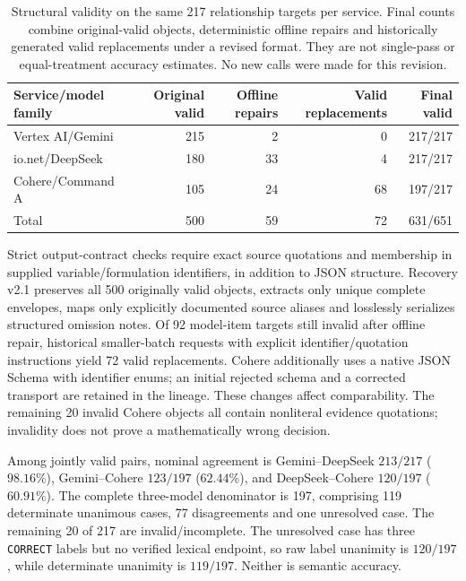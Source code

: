 \begin{table}[htbp]\centering\small
\caption{Structural validity on the same 217 relationship targets per service. Final counts combine original-valid objects, deterministic offline repairs and historically generated valid replacements under a revised format. They are not single-pass or equal-treatment accuracy estimates. No new calls were made for this revision.}\label{tab:relationship-validity}
\setlength{\tabcolsep}{3.5pt}
\begin{tabular}{@{}lrrrr@{}}\toprule
Service/model family & Original valid & Offline repairs & Valid replacements & Final valid\\\midrule
Vertex AI/Gemini & 215 & 2 & 0 & 217/217\\
io.net/DeepSeek & 180 & 33 & 4 & 217/217\\
Cohere/Command A & 105 & 24 & 68 & 197/217\\\midrule
Total & 500 & 59 & 72 & 631/651\\\bottomrule
\end{tabular}\end{table}

Strict output-contract checks require exact source quotations and membership in supplied variable/formulation identifiers, in addition to JSON structure. Recovery v2.1 preserves all 500 originally valid objects, extracts only unique complete envelopes, maps only explicitly documented source aliases and losslessly serializes structured omission notes. Of 92 model-item targets still invalid after offline repair, historical smaller-batch requests with explicit identifier/quotation instructions yield 72 valid replacements. Cohere additionally uses a native JSON Schema with identifier enums; an initial rejected schema and a corrected transport are retained in the lineage. These changes affect comparability. The remaining 20 invalid Cohere objects all contain nonliteral evidence quotations; invalidity does not prove a mathematically wrong decision.

Among jointly valid pairs, nominal agreement is Gemini--DeepSeek $213/217$ ($98.16\%$), Gemini--Cohere $123/197$ ($62.44\%$), and DeepSeek--Cohere $120/197$ ($60.91\%$). The complete three-model denominator is 197, comprising 119 determinate unanimous cases, 77 disagreements and one unresolved case. The remaining 20 of 217 are invalid/incomplete. The unresolved case has three \texttt{CORRECT} labels but no verified lexical endpoint, so raw label unanimity is $120/197$, while determinate unanimity is $119/197$. Neither is semantic accuracy.

